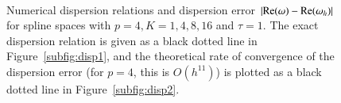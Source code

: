 \documentclass[preprint,10pt]{elsarticle}
\newcommand{\LRb}[1]{\left| #1 \right|}
\newcommand{\reviewerOne}[1]{#1}
\begin{document}
\begin{figure}
\centering
{}
\\
\caption{Numerical dispersion relations and dispersion error $\LRb{{\rm Re}(\omega) - {\rm Re}(\omega_h)}$ for spline spaces with $p = 4, K = 1, 4, 8, 16$ and $\tau = 1$.  The exact dispersion relation is given as a black dotted line in Figure~\ref{subfig:disp1}, \reviewerOne{ and the theoretical rate of convergence of the dispersion error (for $p=4$, this is $O(h^{11})$) is plotted as a black dotted line in Figure~\ref{subfig:disp2}}.  }
\label{fig:eigerr1}
\end{figure}
\end{document}
